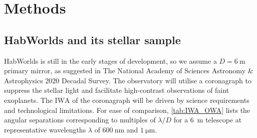 \documentclass[usenatbib]{mnras}
\newcommand{\IWA}{\ensuremath{\mathrm{IWA}}\xspace}
\newcommand{\HWO}{HabWorlds\xspace}
\begin{document}
\section{Methods}


\subsection{\HWO and its stellar sample}
\label{subsec:2.1}

\HWO is still in the early stages of development, so we assume a $D=\qty{6}{\meter}$ primary mirror, as suggested in The National Academy of Sciences Astronomy \& Astrophysics 2020 Decadal Survey.
%
The observatory will utilise a coronagraph to suppress the stellar light and facilitate high-contrast observations of faint exoplanets. 
%
The \IWA of the coronagraph will be driven by science requirements and technological limitations. 
For ease of comparison, \cref{tab:IWA_OWA} lists the angular separations corresponding to multiples of $\lambda / D$ for a \qty{6}{\meter} telescope at representative wavelengths $\lambda$ of $\qty{600}{\nano\meter}$ and $\qty{1}{\micro\meter}$.
\end{document}
